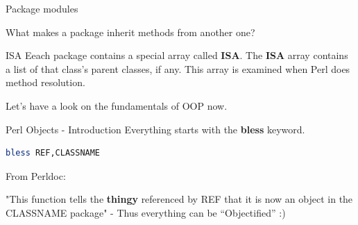 \documentclass[10pt]{beamer}
\begin{document}


\begin{frame}{Package modules}

What makes a package inherit methods from another one?

\begin{alertblock}{ISA}
Eeach package contains a special array called \textbf{ISA}. The \textbf{ISA} array contains a list of that class's parent classes, if any. This array is examined when Perl does method resolution.
\end{alertblock}

Let's have a look on the fundamentals of OOP now.
\end{frame}

\begin{frame}[fragile]{Perl Objects - Introduction}
Everything starts with the \textbf{bless} keyword.
\begin{lstlisting}[language=perl]
bless REF,CLASSNAME
\end{lstlisting}

From Perldoc:

"This function tells the \textbf{thingy} referenced by REF that it is now an object in the CLASSNAME package" - Thus everything can be ``Objectified'' :)

\end{frame}
\end{document}
